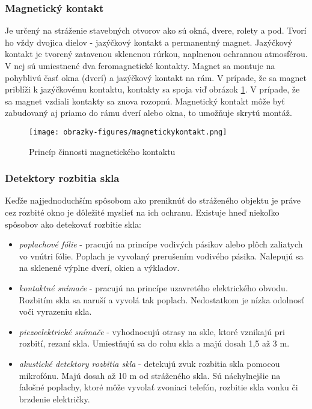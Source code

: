\subsubsection{Magnetický kontakt}

Je určený na stráženie stavebných otvorov ako sú okná, dvere, rolety a pod. Tvorí ho vždy dvojica dielov - jazýčkový kontakt a permanentný magnet. Jazýčkový kontakt je tvorený zatavenou sklenenou rúrkou, naplnenou ochrannou atmosférou. V nej sú umiestnené dva feromagnetické kontakty. Magnet sa montuje na pohyblivú časť okna (dverí) a jazýčkový kontakt na rám. V prípade, že sa magnet priblíži k jazýčkovému kontaktu, kontakty sa spoja viď obrázok \ref{fig:magnetickykontakt}. V prípade, že sa magnet vzdiali kontakty sa znova rozopnú. Magnetický kontakt môže byť zabudovaný aj priamo do rámu dverí alebo okna, to umožňuje skrytú montáž.\cite{velas_ezs}

\begin{figure}[hbt]
    \centering
    \texttt{[image: obrazky-figures/magnetickykontakt.png]}
    \caption{Princíp činnosti magnetického kontaktu\cite{magnetickykontakt}}
    \label{fig:magnetickykontakt}
\end{figure}

\subsubsection{Detektory rozbitia skla}

Keďže najjednoduchším spôsobom ako preniknúť do stráženého objektu je práve cez rozbité okno je dôležité myslieť na ich ochranu. Existuje hneď niekoľko spôsobov ako detekovať rozbitie skla:
\begin{itemize}
    \item \textit{poplachové fólie} - pracujú na princípe vodivých pásikov alebo plôch zaliatych vo vnútri fólie. Poplach je vyvolaný prerušením vodivého pásika. Nalepujú sa na sklenené výplne dverí, okien a výkladov.
    \item \textit{kontaktné snímače} - pracujú na princípe uzavretého elektrického obvodu. Rozbitím skla sa naruší a vyvolá tak poplach. Nedostatkom je nízka odolnosť voči vyrazeniu skla.
    \item \textit{piezoelektrické snímače} - vyhodnocujú otrasy na skle, ktoré vznikajú pri rozbití, rezaní skla. Umiestňujú sa do rohu skla a majú dosah 1,5 až 3 m.
    \item \textit{akustické detektory rozbitia skla} - detekujú zvuk rozbitia skla pomocou mikrofónu. Majú dosah až 10 m od stráženého skla. Sú náchylnejšie na falošné poplachy, ktoré môže vyvolať zvoniaci telefón, rozbitie skla vonku či brzdenie električky.
\end{itemize}


